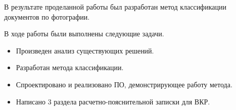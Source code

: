 \Conclusion %

В результате проделанной работы был разработан метод классификации документов по фотографии. 

В ходе работы были выполнены следующие задачи.
\begin{itemize}
\item Произведен анализ существующих решений.
\item Разработан метода классификации.
\item Спроектировано и реализовано ПО, демонстрирующее работу метода.
\item Написано 3 раздела расчетно-пояснительной записки для ВКР.
\end{itemize}
